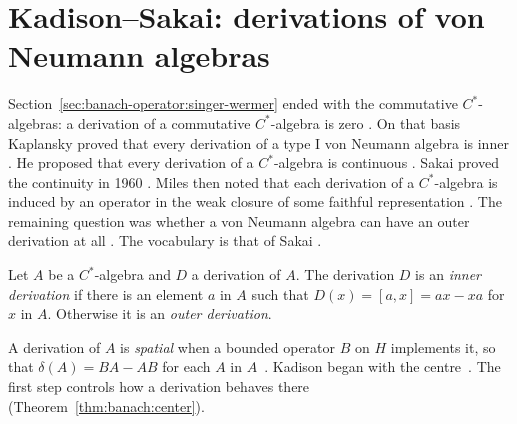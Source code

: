 \section{Kadison--Sakai: derivations of von Neumann algebras}\label{sec:banach-operator:kadison-sakai}

Section~\ref{sec:banach-operator:singer-wermer} ended with the commutative
$C^*$-algebras: a derivation of a commutative $C^*$-algebra is zero
\cite[p.~280]{Kadison1966}. On that basis Kaplansky proved that every
derivation of a type I von Neumann algebra is inner
\cite[p.~280]{Kadison1966}. He proposed
that every derivation of a $C^*$-algebra is continuous
\cite[p.~280]{Kadison1966}. Sakai proved the continuity in 1960
\cite[p.~31]{Sakai1960Kaplansky}. Miles then noted that each derivation of
a $C^*$-algebra is induced by an operator in the weak closure of some
faithful representation \cite[pp.~273--274]{Sakai1966}. The remaining
question was whether a von Neumann algebra can have an outer derivation at
all \cite[p.~273]{Sakai1966}. The vocabulary is that of Sakai
\cite[pp.~273--274]{Sakai1966}.

\begin{definition}\label{def:banach:inner}
Let $A$ be a $C^*$-algebra and $D$ a derivation of $A$. The derivation $D$
is an \emph{inner derivation} if there is an element $a$ in $A$ such that
$D(x)=[a,x]=ax-xa$ for $x$ in $A$. Otherwise it is an \emph{outer
derivation}.
\end{definition}

A derivation of $A$ is \emph{spatial} when a bounded operator $B$ on $H$
implements it, so that $\delta(A)=BA-AB$ for each $A$ in
$A$~\cite[p.~281]{Kadison1966}. Kadison began with the centre~\cite[Theorem~2,
p.~281]{Kadison1966}. The first step controls how a derivation behaves there~
(Theorem~\ref{thm:banach:center})\cite[Theorem~2, p.~281]{Kadison1966}.

